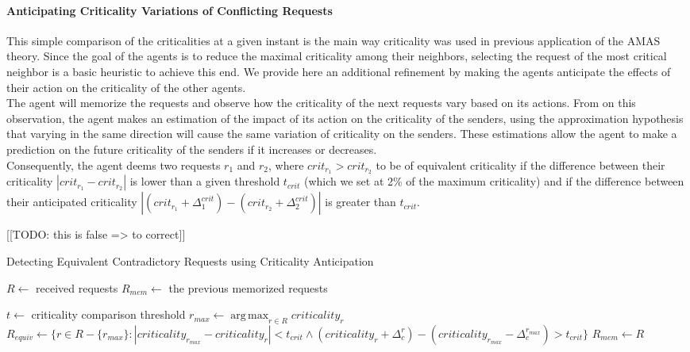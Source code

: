 \paragraph*{Anticipating Criticality Variations of Conflicting Requests}

This simple comparison of the criticalities at a given instant is the main way criticality was used in previous application of the AMAS theory. Since the goal of the agents is to reduce the maximal criticality among their neighbors, selecting the request of the most critical neighbor is a basic heuristic to achieve this end. We provide here an additional refinement by making the agents anticipate the effects of their action on the criticality of the other agents.\\
The agent will memorize the requests and observe how the criticality of the next requests vary based on its actions. From on this observation, the agent makes an estimation of the impact of its action on the criticality of the senders, using the approximation hypothesis that varying in the same direction will cause the same variation of criticality on the senders. These estimations allow the agent to make a prediction on the future criticality of the senders if it increases or decreases.\\
Consequently, the agent deems two requests $r_1$ and $r_2$, where $crit_{r_1} > crit_{r_2}$ to be of equivalent criticality if the difference between their criticality $|crit_{r_1} - crit_{r_2}|$ is lower than a given threshold $t_{crit}$ (which we set at 2\% of the maximum criticality) and if the difference between their anticipated criticality $| (crit_{r_1} + \Delta_1^{crit}) - (crit_{r_2} + \Delta_2^{crit})|$ is greater than $t_{crit}$.

[[TODO: this is false => to correct]]

\begin{algorithm}
\caption{Detecting Equivalent Contradictory Requests using Criticality Anticipation}
\label{algo_criticality_anticipation}
	$R \leftarrow $ received requests\;
	$R_{mem} \leftarrow $ the previous memorized requests\;
	
	$t \leftarrow$ criticality comparison threshold\;
	\BlankLine
	$r_{max} \leftarrow \displaystyle\operatorname*{arg\,max}_{r \in R}criticality_r$\;
	$R_{equiv} \leftarrow \{ r \in R-\{r_{max}\}: | criticality_{r_{max}} - criticality_{r} | < t_{crit} 		\wedge 	(criticality_{r} + \Delta_c^{r}) - (criticality_{r_{max}} - \Delta_c^{r_{max}}) > t_{crit}\} $\;
	\BlankLine
	$R_{mem} \leftarrow R$\;
\end{algorithm}

